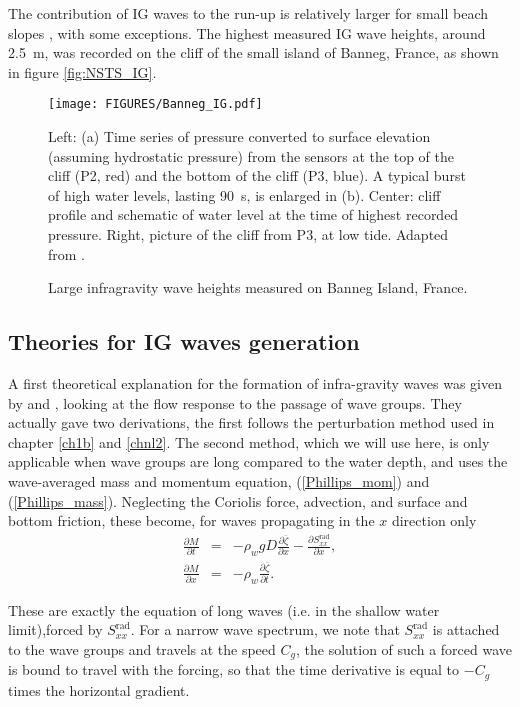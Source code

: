 The contribution of IG waves to the run-up is relatively larger for small beach slopes \citep{Stockdon&al.2006}, with some exceptions. 
The highest measured IG wave heights, around 2.5~m, was recorded on the cliff 
of the small island of Banneg, France, as shown in figure \ref{fig:NSTS_IG}. 
\begin{figure}[htb]
\centerline{\texttt{[image: FIGURES/Banneg\_IG.pdf]}}
  \caption{Large infragravity wave heights measured on Banneg Island, France.}
    {Left: (a) Time series of pressure converted to surface elevation (assuming hydrostatic pressure) from the sensors at the top of the cliff (P2, red) and the bottom of the cliff (P3, blue). 
    A typical burst of high water levels, lasting 90~s, is enlarged in (b). Center: cliff profile and schematic of water level at the time
    of highest recorded pressure. Right, picture of the cliff from P3, at low tide. Adapted 
    from \cite{Sheremet&al.2014}.}
\label{fig:Banneg_IG}
\end{figure}


\subsection{Theories for IG waves generation}
A first theoretical explanation for the formation of infra-gravity waves was given by \cite{Witham1962} and \cite{Longuet-Higgins&Stewart1962},  looking 
at the flow response to the passage of wave groups. They actually gave two derivations, the first follows the perturbation method used in chapter \ref{ch1b} and 
\ref{chnl2}. The second method, which we will use here, is only applicable when wave groups are long compared to the water depth, 
and uses the wave-averaged mass and momentum equation, (\ref{Phillips_mom}) and (\ref{Phillips_mass}). 
Neglecting 
the Coriolis force, advection, and surface and bottom friction, these become, for waves propagating in the $x$ direction only 
\begin{eqnarray}
\frac{\partial M}{\partial t}&=& - \rho_w g D \frac{\partial \overline{\zeta}}{\partial x}  - \frac{\partial S_{xx}^{\mathrm{rad}}}{\partial x},  \\
\frac{\partial M}{\partial x}&=& - \rho_w  \frac{\partial  \overline{\zeta}}{\partial t}.
\end{eqnarray}

These are exactly the equation of long waves (i.e. in the shallow water limit),forced by $S_{xx}^{\mathrm{rad}}$. For a narrow wave spectrum, we note that
$S_{xx}^{\mathrm{rad}}$ is 
attached to the wave groups and travels at the speed $C_g$, the solution of such a forced wave is bound to travel with the forcing, so that  the time 
derivative is equal to $-C_g$ times the horizontal gradient. 

